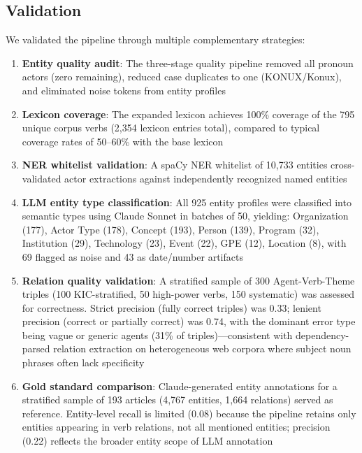\documentclass[../main.tex]{subfiles}
\begin{document}
\subsection{Validation}

We validated the pipeline through multiple complementary strategies:

\begin{enumerate}
    \item \textbf{Entity quality audit}: The three-stage quality pipeline removed all pronoun actors (zero remaining), reduced case duplicates to one (KONUX/Konux), and eliminated noise tokens from entity profiles
    \item \textbf{Lexicon coverage}: The expanded lexicon achieves 100\% coverage of the 795 unique corpus verbs (2,354 lexicon entries total), compared to typical coverage rates of 50--60\% with the base lexicon
    \item \textbf{NER whitelist validation}: A spaCy NER whitelist of 10,733 entities cross-validated actor extractions against independently recognized named entities
    \item \textbf{LLM entity type classification}: All 925 entity profiles were classified into semantic types using Claude Sonnet in batches of 50, yielding: Organization (177), Actor Type (178), Concept (193), Person (139), Program (32), Institution (29), Technology (23), Event (22), GPE (12), Location (8), with 69 flagged as noise and 43 as date/number artifacts
    \item \textbf{Relation quality validation}: A stratified sample of 300 Agent-Verb-Theme triples (100 KIC-stratified, 50 high-power verbs, 150 systematic) was assessed for correctness. Strict precision (fully correct triples) was 0.33; lenient precision (correct or partially correct) was 0.74, with the dominant error type being vague or generic agents (31\% of triples)---consistent with dependency-parsed relation extraction on heterogeneous web corpora where subject noun phrases often lack specificity
    \item \textbf{Gold standard comparison}: Claude-generated entity annotations for a stratified sample of 193 articles (4,767 entities, 1,664 relations) served as reference. Entity-level recall is limited (0.08) because the pipeline retains only entities appearing in verb relations, not all mentioned entities; precision (0.22) reflects the broader entity scope of LLM annotation
\end{enumerate}
\end{document}
